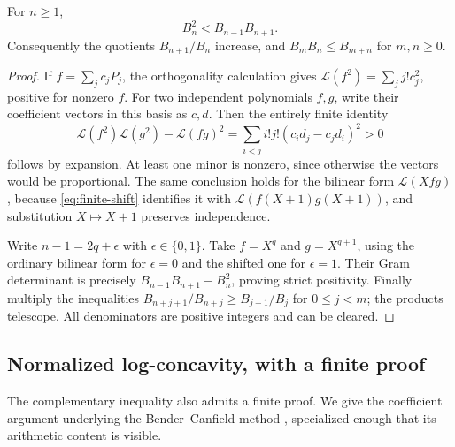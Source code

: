 \begin{corollary}\label{cor:strict-logconvex}
For $n\geq1$,
\begin{equation}\label{eq:strict-logconvex}
 B_n^2<B_{n-1}B_{n+1}.
\end{equation}
Consequently the quotients $B_{n+1}/B_n$ increase, and
$B_mB_n\leq B_{m+n}$ for $m,n\geq0$.
\end{corollary}
\begin{proof}
If $f=\sum_jc_jP_j$, the orthogonality calculation gives
$\mathcal L(f^2)=\sum_jj!c_j^2$, positive for nonzero $f$.
For two independent polynomials $f,g$, write their coefficient vectors in this
basis as $c,d$. Then the entirely finite identity
\[
 \mathcal L(f^2)\mathcal L(g^2)-\mathcal L(fg)^2
       =\sum_{i<j}i!j!(c_id_j-c_jd_i)^2>0
\]
follows by expansion. At least one minor is nonzero, since otherwise the
vectors would be proportional. The same conclusion holds for the bilinear
form $\mathcal L(Xfg)$, because \eqref{eq:finite-shift} identifies it with
$\mathcal L(f(X+1)g(X+1))$, and substitution $X\mapsto X+1$ preserves
independence.

Write $n-1=2q+\epsilon$ with $\epsilon\in\{0,1\}$. Take $f=X^q$ and
$g=X^{q+1}$, using the ordinary bilinear form for $\epsilon=0$ and the shifted
one for $\epsilon=1$. Their Gram determinant is precisely
$B_{n-1}B_{n+1}-B_n^2$, proving strict positivity. Finally multiply the
inequalities
$B_{n+j+1}/B_{n+j}\geq B_{j+1}/B_j$ for $0\leq j<m$; the products telescope.
All denominators are positive integers and can be cleared.
\end{proof}

\subsection{Normalized log-concavity, with a finite proof}
\label{subsec:logconcavity}

The complementary inequality also admits a finite proof. We give the
coefficient argument underlying the Bender--Canfield method
\cite{bender-canfield}, specialized enough that its arithmetic content is
visible.

